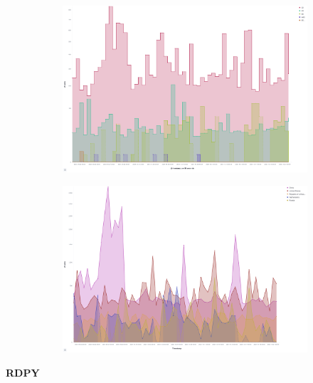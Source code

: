 \begin{figure}
    \centering

    \begin{subfigure}[b]{0.49\textwidth}
        \centering
        \includegraphics[width=\textwidth]{figures/tpot-cowire-attacks.png}
        \caption{}
        \label{fig:tpot-honeytrap-attacks}
    \end{subfigure}
    \hfill
    \begin{subfigure}[b]{0.49\textwidth}
        \centering
        \includegraphics[width=\textwidth]{figures/tpot-cowire-country.png}
        \caption{}
        \label{fig:tpot-honeytrap-country}
    \end{subfigure}
    \caption[]{}
    \label{fig:honeytrap-results}
\end{figure}

\textbf{RDPY}

